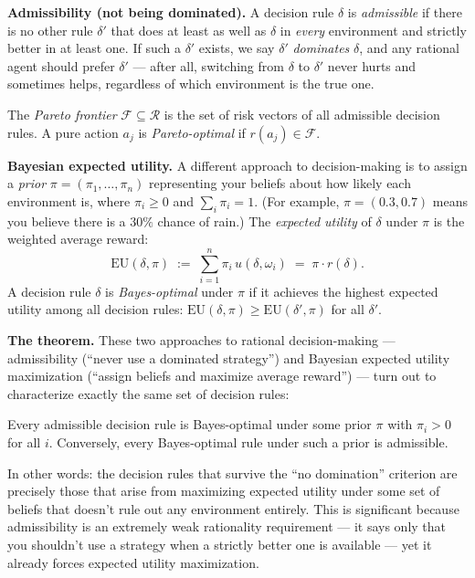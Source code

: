 \documentclass[11pt]{article}
\begin{document}
\begin{exercise}
\medskip
\noindent
\textbf{Admissibility (not being dominated).} A decision rule $\delta$ is
\emph{admissible} if there is no other rule $\delta'$ that does at least as well as
$\delta$ in \emph{every} environment and strictly better in at least one. If such a
$\delta'$ exists, we say $\delta'$ \emph{dominates} $\delta$, and any rational agent
should prefer $\delta'$ --- after all, switching from $\delta$ to $\delta'$ never
hurts and sometimes helps, regardless of which environment is the true one.

\medskip
\noindent
The \emph{Pareto frontier} $\mathcal{F} \subseteq \mathcal{R}$ is the set of risk
vectors of all admissible decision rules. A pure action $a_j$ is
\emph{Pareto-optimal} if $r(a_j) \in \mathcal{F}$.

\medskip
\noindent
\textbf{Bayesian expected utility.} A different approach to decision-making is to
assign a \emph{prior} $\pi = (\pi_1, \ldots, \pi_n)$ representing your beliefs about
how likely each environment is, where $\pi_i \geq 0$ and $\sum_i \pi_i = 1$. (For
example, $\pi = (0.3, 0.7)$ means you believe there is a $30\%$ chance of rain.) The
\emph{expected utility} of $\delta$ under $\pi$ is the weighted average reward:
\[
  \mathrm{EU}(\delta, \pi) \;:=\;
  \sum_{i=1}^n \pi_i\, u(\delta, \omega_i) \;=\; \pi \cdot r(\delta).
\]
A decision rule $\delta$ is \emph{Bayes-optimal} under $\pi$ if it achieves the
highest expected utility among all decision rules:
$\mathrm{EU}(\delta, \pi) \geq \mathrm{EU}(\delta', \pi)$ for all $\delta'$.

\medskip
\noindent
\textbf{The theorem.} These two approaches to rational decision-making ---
admissibility (``never use a dominated strategy'') and Bayesian expected utility
maximization (``assign beliefs and maximize average reward'') --- turn out to
characterize exactly the same set of decision rules:

\begin{theorem}
Every admissible decision rule is
Bayes-optimal under some prior $\pi$ with $\pi_i > 0$ for all $i$. Conversely, every
Bayes-optimal rule under such a prior is admissible.
\end{theorem}

\medskip
\noindent
In other words: the decision rules that survive the ``no domination'' criterion are
precisely those that arise from maximizing expected utility under some set of beliefs
that doesn't rule out any environment entirely. This is significant because
admissibility is an extremely weak rationality requirement --- it says only that you
shouldn't use a strategy when a strictly better one is available --- yet it already
forces expected utility maximization.


\end{exercise}
\end{document}
